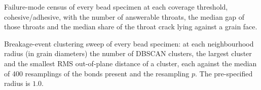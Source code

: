 \documentclass[preprint,12pt]{elsarticle}
\begin{document}
\begin{table}[p]
  \centering
  \caption{Failure-mode census of every bead specimen at each coverage
    threshold, cohesive/adhesive, with the number of answerable throats, the
    median gap of those throats and the median share of the throat crack
    lying against a grain face.}
  \label{tab:fm}
  \footnotesize
  
\end{table}

\begin{table}[p]
  \centering
  \caption{Breakage-event clustering sweep of every bead specimen: at each
    neighbourhood radius (in grain diameters) the number of DBSCAN clusters,
    the largest cluster and the smallest RMS out-of-plane distance of a
    cluster, each against the median of 400 resamplings of the bonds present
    and the resampling $p$.  The pre-specified radius is $1.0$.}
  \label{tab:cluster}
  \scriptsize
  \renewcommand{\arraystretch}{0.82}
  
\end{table}
\end{document}
